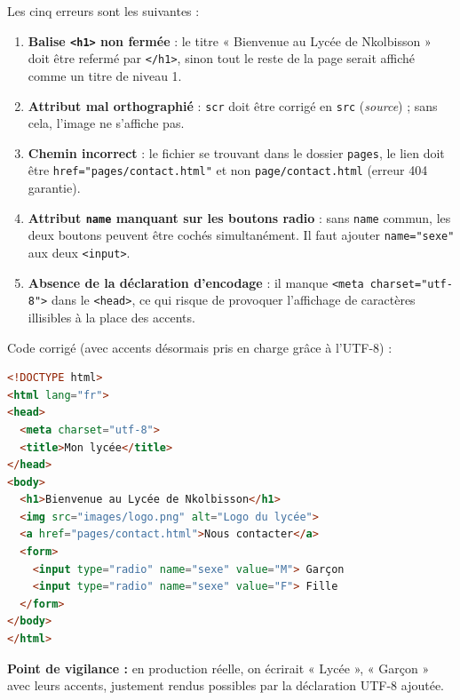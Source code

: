 \documentclass[11pt]{article}
\begin{document}
\begin{corrige}
Les cinq erreurs sont les suivantes :
\begin{enumerate}
\item \textbf{Balise \texttt{<h1>} non fermée} : le titre « Bienvenue au Lycée de Nkolbisson » doit être refermé par \texttt{</h1>}, sinon tout le reste de la page serait affiché comme un titre de niveau 1.
\item \textbf{Attribut mal orthographié} : \texttt{scr} doit être corrigé en \texttt{src} (\emph{source}) ; sans cela, l'image ne s'affiche pas.
\item \textbf{Chemin incorrect} : le fichier se trouvant dans le dossier \texttt{pages}, le lien doit être \texttt{href="pages/contact.html"} et non \texttt{page/contact.html} (erreur 404 garantie).
\item \textbf{Attribut \texttt{name} manquant sur les boutons radio} : sans \texttt{name} commun, les deux boutons peuvent être cochés simultanément. Il faut ajouter \texttt{name="sexe"} aux deux \texttt{<input>}.
\item \textbf{Absence de la déclaration d'encodage} : il manque \texttt{<meta charset="utf-8">} dans le \texttt{<head>}, ce qui risque de provoquer l'affichage de caractères illisibles à la place des accents.
\end{enumerate}
Code corrigé (avec accents désormais pris en charge grâce à l'UTF-8) :
\begin{lstlisting}[language=HTML]
<!DOCTYPE html>
<html lang="fr">
<head>
  <meta charset="utf-8">
  <title>Mon lycée</title>
</head>
<body>
  <h1>Bienvenue au Lycée de Nkolbisson</h1>
  <img src="images/logo.png" alt="Logo du lycée">
  <a href="pages/contact.html">Nous contacter</a>
  <form>
    <input type="radio" name="sexe" value="M"> Garçon
    <input type="radio" name="sexe" value="F"> Fille
  </form>
</body>
</html>
\end{lstlisting}
\textbf{Point de vigilance :} en production réelle, on écrirait « Lycée », « Garçon » avec leurs accents, justement rendus possibles par la déclaration UTF-8 ajoutée.
\end{corrige}
\end{document}
